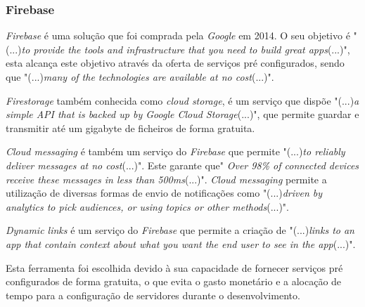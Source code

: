 \subsubsection{Firebase}
\emph{Firebase} é uma solução que foi comprada pela \textit{Google} em 2014. O seu objetivo é "(...)\emph{to provide the tools and infrastructure that you need to build great apps}(...)"\citep{Moroney2017}, esta alcança este objetivo através da oferta de serviços pré configurados, sendo que "(...)\emph{many of the technologies are available at no cost}(...)"\citep{Moroney2017}.

\textit{Firestorage} também conhecida como \textit{cloud storage}, é um serviço que dispõe "(...)\emph{a simple	API that is backed up by Google Cloud Storage}(...)"\citep{Moroney2017}, que permite guardar e transmitir até um gigabyte de ficheiros de forma gratuita.

\textit{Cloud messaging} é também um serviço do \textit{Firebase} que permite "(...)\emph{to reliably deliver messages at no cost}(...)"\citep{Moroney2017}. Este garante que" \emph{Over 98\% of connected devices receive these messages in less than 500ms}(...)"\citep{Moroney2017}. \textit{Cloud messaging} permite a utilização de diversas formas de envio de notificações como "(...)\emph{driven by analytics to pick audiences, or using topics or other methods}(...)"\citep{Moroney2017}.

\textit{Dynamic links} é um serviço do \textit{Firebase} que permite a criação de "(...)\emph{links to an app that contain context about what you want the end user to see in the app}(...)"\citep{Moroney2017}.

Esta ferramenta foi escolhida devido à sua capacidade de fornecer serviços pré configurados de forma gratuita, o que evita o gasto monetário e a alocação de tempo para a configuração de servidores durante o desenvolvimento.